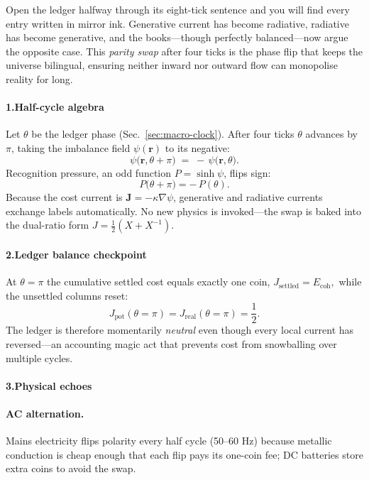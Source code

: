 \documentclass[11pt,oneside]{book}
\begin{document}
Open the ledger halfway through its eight-tick sentence and you will find every entry written in mirror ink.  
Generative current has become radiative, radiative has become generative, and the books—though perfectly balanced—now argue the opposite case.  
This \emph{parity swap} after four ticks is the phase flip that keeps the universe bilingual, ensuring neither inward nor outward flow can monopolise reality for long.

\paragraph*{1.\;Half-cycle algebra}

Let $\theta$ be the ledger phase (Sec.~\ref{sec:macro-clock}).  
After four ticks $\theta$ advances by $\pi$, taking the imbalance field
$\psi(\mathbf r)$ to its negative:
\[
  \psi\bigl(\mathbf r,\theta+\pi\bigr)
  \;=\;
  -\,\psi\bigl(\mathbf r,\theta\bigr).
\]
Recognition pressure, an odd function $P=\sinh\psi$, flips sign:
\[
  P\bigl(\theta+\pi\bigr) = -\,P(\theta).
\]
Because the cost current is $\mathbf J=-\kappa\nabla\psi$,
generative and radiative currents exchange labels automatically.  
No new physics is invoked—the swap is baked into the dual-ratio form
$J=\frac12(X+X^{-1})$.

\paragraph*{2.\;Ledger balance checkpoint}

At $\theta=\pi$ the cumulative settled cost equals exactly one coin,
\(
  J_{\text{settled}} = E_{\text{coh}},
\)
while the unsettled columns reset:
\[
  J_{\text{pot}}(\theta=\pi) = J_{\text{real}}(\theta=\pi) = \frac12.
\]
The ledger is therefore momentarily \emph{neutral} even though every
local current has reversed—an accounting magic act that prevents cost
from snowballing over multiple cycles.

\paragraph*{3.\;Physical echoes}

\paragraph*{AC alternation.}  
Mains electricity flips polarity every half cycle (50–60 Hz) because
metallic conduction is cheap enough that each flip pays its one-coin
fee; DC batteries store extra coins to avoid the swap.
\end{document}
